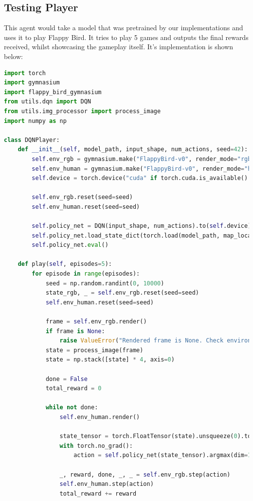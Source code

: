 \documentclass[a4paper,12pt]{article}
\begin{document}
\subsection{Testing Player}
This agent would take a model that was pretrained by our implementations and uses it to play Flappy Bird. It tries to play 5 games and outputs the final rewards received,
whilst showcasing the gameplay itself. It's implementation is shown below:
\begin{lstlisting}[language=Python, caption=Testing player]
import torch
import gymnasium
import flappy_bird_gymnasium
from utils.dqn import DQN
from utils.img_processor import process_image
import numpy as np

class DQNPlayer:
    def __init__(self, model_path, input_shape, num_actions, seed=42):
        self.env_rgb = gymnasium.make("FlappyBird-v0", render_mode="rgb_array",use_lidar = False)
        self.env_human = gymnasium.make("FlappyBird-v0", render_mode="human",use_lidar = False)
        self.device = torch.device("cuda" if torch.cuda.is_available() else "cpu")

        self.env_rgb.reset(seed=seed)
        self.env_human.reset(seed=seed)

        self.policy_net = DQN(input_shape, num_actions).to(self.device)
        self.policy_net.load_state_dict(torch.load(model_path, map_location=self.device))
        self.policy_net.eval()  

    def play(self, episodes=5):
        for episode in range(episodes):
            seed = np.random.randint(0, 10000)  
            state_rgb, _ = self.env_rgb.reset(seed=seed)
            self.env_human.reset(seed=seed)  

            frame = self.env_rgb.render()  
            if frame is None:
                raise ValueError("Rendered frame is None. Check environment's render_mode.")
            state = process_image(frame)
            state = np.stack([state] * 4, axis=0)  

            done = False
            total_reward = 0

            while not done:
                self.env_human.render()

                state_tensor = torch.FloatTensor(state).unsqueeze(0).to(self.device)
                with torch.no_grad():
                    action = self.policy_net(state_tensor).argmax(dim=1).item()

                _, reward, done, _, _ = self.env_rgb.step(action)
                self.env_human.step(action) 
                total_reward += reward
    

\end{lstlisting}
\end{document}
